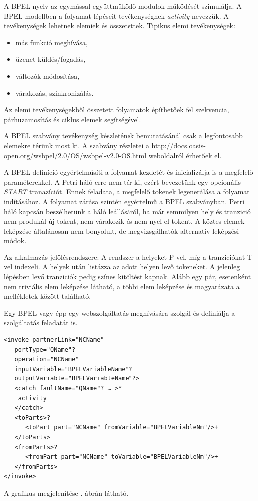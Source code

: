 

A BPEL nyelv az egymással együttműködő modulok működését szimulálja. A BPEL  modellben a folyamat lépéseit tevékenységnek \textsl{activity} nevezzük. A tevékenységek lehetnek elemiek és összetettek. Tipikus elemi tevékenységek:
\begin{itemize}
\item más funkció meghívása,
\item üzenet küldés/fogadás,
\item változók módosítása,
\item várakozás, szinkronizálás.
\end{itemize}
Az elemi tevékenységekből összetett folyamatok építhetőek fel szekvencia, párhuzamosítás és ciklus elemek segítségével.

A BPEL szabvány tevékenység készletének bemutatásánál csak a legfontosabb elemekre térünk most ki. A szabvány részletei a
http://docs.oasis-open.org/wsbpel/2.0/OS/wsbpel-v2.0-OS.html weboldalról érhetőek el. 

A BPEL definíció egyértelműsíti a folyamat kezdetét és inicializálja is a megfelelő paraméterekkel. A Petri háló erre nem tér ki, ezért bevezetünk egy opcionális \textit{START} tranazíciót. Ennek feladata, a megfelelő tokenek legenerálása a folyamat indításához. A folyamat zárása szintén egyértelmű a BPEL szabványban. Petri háló kapcsán beszélhetünk a háló leállásáról, ha már semmilyen hely és tranzició nem produkál új tokent, nem várakozik és nem nyel el tokent. A köztes elemek leképzése általánosan nem bonyolult, de megvizsgálhatók alternatív leképzési módok. 

Az alkalmazás jelölésrendszere: A rendszer a helyeket P-vel, míg a tranziciókat T-vel indexeli. A helyek után listázza az adott helyen levő tokeneket. A jelenleg lépésben levő tranziciók pedig színes kitöltést kapnak. Alább egy pár, esetenként nem triviális elem leképzése látható, a többi elem leképzése és magyarázata a mellékletek között található.

Egy BPEL vagy épp egy webszolgáltatás meghívására szolgál és definiálja a szolgáltatás feladatát is. 
\begin{verbatim}
<invoke partnerLink="NCName"
   portType="QName"?
   operation="NCName"
   inputVariable="BPELVariableName"?
   outputVariable="BPELVariableName"?>
   <catch faultName="QName"? … >*
  	activity
   </catch>
   <toParts>?
      <toPart part="NCName" fromVariable="BPELVariableNm"/>+
   </toParts>
   <fromParts>?
      <fromPart part="NCName" toVariable="BPELVariableNm"/>+
   </fromParts>
</invoke>
\end{verbatim}
A grafikus megjelenítése . ábrán látható.


